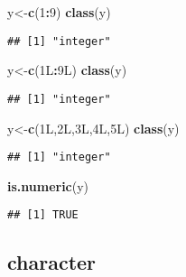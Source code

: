 \documentclass[
]{article}
\newenvironment{Shaded}{\begin{snugshade}}{\end{snugshade}}
\newcommand{\DataTypeTok}[1]{\textcolor[rgb]{0.13,0.29,0.53}{#1}}
\newcommand{\DecValTok}[1]{\textcolor[rgb]{0.00,0.00,0.81}{#1}}
\newcommand{\FunctionTok}[1]{\textcolor[rgb]{0.13,0.29,0.53}{\textbf{#1}}}
\newcommand{\NormalTok}[1]{#1}
\newcommand{\OtherTok}[1]{\textcolor[rgb]{0.56,0.35,0.01}{#1}}
\newcommand{\SpecialCharTok}[1]{\textcolor[rgb]{0.81,0.36,0.00}{\textbf{#1}}}
\begin{document}
\begin{Shaded}
\begin{Highlighting}[]
\NormalTok{y}\OtherTok{\textless{}{-}}\FunctionTok{c}\NormalTok{(}\DecValTok{1}\SpecialCharTok{:}\DecValTok{9}\NormalTok{)}
\FunctionTok{class}\NormalTok{(y)}
\end{Highlighting}
\end{Shaded}

\begin{verbatim}
## [1] "integer"
\end{verbatim}

\begin{Shaded}
\begin{Highlighting}[]
\NormalTok{y}\OtherTok{\textless{}{-}}\FunctionTok{c}\NormalTok{(}\DecValTok{1}\DataTypeTok{L}\SpecialCharTok{:}\DecValTok{9}\DataTypeTok{L}\NormalTok{)}
\FunctionTok{class}\NormalTok{(y)}
\end{Highlighting}
\end{Shaded}

\begin{verbatim}
## [1] "integer"
\end{verbatim}

\begin{Shaded}
\begin{Highlighting}[]
\NormalTok{y}\OtherTok{\textless{}{-}}\FunctionTok{c}\NormalTok{(}\DecValTok{1}\DataTypeTok{L}\NormalTok{,}\DecValTok{2}\DataTypeTok{L}\NormalTok{,}\DecValTok{3}\DataTypeTok{L}\NormalTok{,}\DecValTok{4}\DataTypeTok{L}\NormalTok{,}\DecValTok{5}\DataTypeTok{L}\NormalTok{)}
\FunctionTok{class}\NormalTok{(y)}
\end{Highlighting}
\end{Shaded}

\begin{verbatim}
## [1] "integer"
\end{verbatim}

\begin{Shaded}
\begin{Highlighting}[]
\FunctionTok{is.numeric}\NormalTok{(y)}
\end{Highlighting}
\end{Shaded}

\begin{verbatim}
## [1] TRUE
\end{verbatim}

\subsection{character}\label{character}
\end{document}
